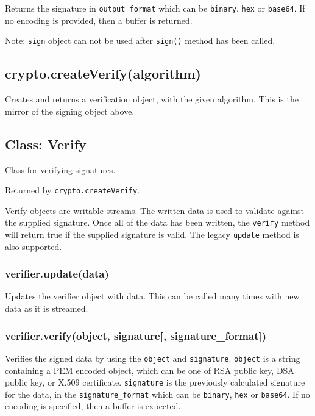 Returns the signature in \texttt{output\_format} which can be
\texttt{\textquotesingle{}binary\textquotesingle{}},
\texttt{\textquotesingle{}hex\textquotesingle{}} or
\texttt{\textquotesingle{}base64\textquotesingle{}}. If no encoding is
provided, then a buffer is returned.

Note: \texttt{sign} object can not be used after \texttt{sign()} method
has been called.

\subsection{crypto.createVerify(algorithm)}\label{crypto.createverifyalgorithm}

Creates and returns a verification object, with the given algorithm.
This is the mirror of the signing object above.

\subsection{Class: Verify}\label{class-verify}

Class for verifying signatures.

Returned by \texttt{crypto.createVerify}.

Verify objects are writable \href{stream.html}{streams}. The written
data is used to validate against the supplied signature. Once all of the
data has been written, the \texttt{verify} method will return true if
the supplied signature is valid. The legacy \texttt{update} method is
also supported.

\subsubsection{verifier.update(data)}\label{verifier.updatedata}

Updates the verifier object with data. This can be called many times
with new data as it is streamed.

\subsubsection{verifier.verify(object, signature{[},
signature\_format{]})}\label{verifier.verifyobject-signature-signatureux5fformat}

Verifies the signed data by using the \texttt{object} and
\texttt{signature}. \texttt{object} is a string containing a PEM encoded
object, which can be one of RSA public key, DSA public key, or X.509
certificate. \texttt{signature} is the previously calculated signature
for the data, in the \texttt{signature\_format} which can be
\texttt{\textquotesingle{}binary\textquotesingle{}},
\texttt{\textquotesingle{}hex\textquotesingle{}} or
\texttt{\textquotesingle{}base64\textquotesingle{}}. If no encoding is
specified, then a buffer is expected.

